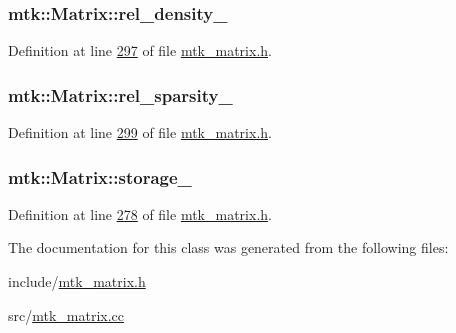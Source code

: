 \hypertarget{classmtk_1_1Matrix_adae5d1f3016d891e67a10d6db658d5a7}{
\subsubsection[{rel\-\_\-density\-\_\-}]{ mtk\-::\-Matrix\-::rel\-\_\-density\-\_\-\hspace{0.3cm}{\ttfamily [private]}}}\label{classmtk_1_1Matrix_adae5d1f3016d891e67a10d6db658d5a7}


Definition at line \hyperlink{mtk__matrix_8h_source_l00297}{297} of file \hyperlink{mtk__matrix_8h_source}{mtk\-\_\-matrix.\-h}.

\hypertarget{classmtk_1_1Matrix_aab48952c7df158b6ee06d8c2c901aa7e}{
\subsubsection[{rel\-\_\-sparsity\-\_\-}]{ mtk\-::\-Matrix\-::rel\-\_\-sparsity\-\_\-\hspace{0.3cm}{\ttfamily [private]}}}\label{classmtk_1_1Matrix_aab48952c7df158b6ee06d8c2c901aa7e}


Definition at line \hyperlink{mtk__matrix_8h_source_l00299}{299} of file \hyperlink{mtk__matrix_8h_source}{mtk\-\_\-matrix.\-h}.

\hypertarget{classmtk_1_1Matrix_ae343697531e0849f20bed4a9760b9a54}{
\subsubsection[{storage\-\_\-}]{ mtk\-::\-Matrix\-::storage\-\_\-\hspace{0.3cm}{\ttfamily [private]}}}\label{classmtk_1_1Matrix_ae343697531e0849f20bed4a9760b9a54}


Definition at line \hyperlink{mtk__matrix_8h_source_l00278}{278} of file \hyperlink{mtk__matrix_8h_source}{mtk\-\_\-matrix.\-h}.



The documentation for this class was generated from the following files\-:\begin{DoxyCompactItemize}
\item 
include/\hyperlink{mtk__matrix_8h}{mtk\-\_\-matrix.\-h}\item 
src/\hyperlink{mtk__matrix_8cc}{mtk\-\_\-matrix.\-cc}\end{DoxyCompactItemize}
